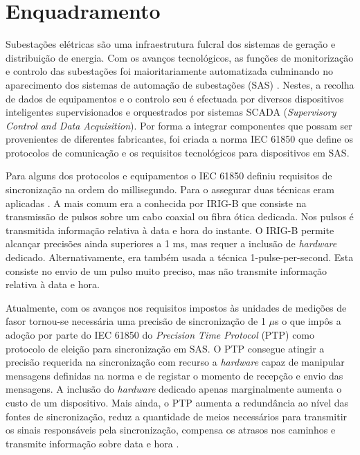\section{Enquadramento}
Subestações elétricas são uma infraestrutura fulcral dos sistemas de geração e distribuição de energia. Com os avanços tecnológicos, as funções de monitorização e controlo das subestações foi maioritariamente automatizada culminando no aparecimento dos sistemas de automação de subestações (SAS) \cite{SAS}. Nestes, a recolha de dados de equipamentos e o controlo seu é efectuada por diversos dispositivos inteligentes supervisionados e orquestrados por sistemas SCADA (\textit{Supervisory Control and Data Acquisition}). Por forma a integrar componentes que possam ser provenientes de diferentes fabricantes, foi criada a norma IEC 61850 que define os protocolos de comunicação e os requisitos tecnológicos para dispositivos em SAS.    \par 
Para alguns dos protocolos e equipamentos o IEC 61850 definiu requisitos de sincronização na ordem do millisegundo. Para o assegurar duas técnicas eram aplicadas \cite{Electrical}. A mais comum era a conhecida por IRIG-B que consiste na transmissão de pulsos sobre um cabo coaxial ou fibra ótica dedicada. Nos pulsos é transmitida informação relativa à data e hora do instante. O IRIG-B permite alcançar precisões ainda superiores a 1 ms, mas requer a inclusão de \textit{hardware} dedicado. Alternativamente, era também usada a técnica 1-pulse-per-second. Esta consiste no envio de um pulso muito preciso, mas não transmite informação relativa à data e hora.\par 
Atualmente, com os avanços nos requisitos impostos às unidades de medições de fasor tornou-se necessária uma precisão de sincronização de 1 $\mu$s o que impôs a adoção por parte do IEC 61850 do \textit{Precision Time Protocol} (PTP) \cite{PTP} como protocolo de eleição para sincronização em SAS. O PTP consegue atingir a precisão requerida na sincronização com recurso a \textit{hardware} capaz de manipular mensagens definidas na norma e de registar o momento de recepção e envio das mensagens. A inclusão do \textit{hardware} dedicado apenas marginalmente aumenta o custo de um dispositivo. Mais ainda, o PTP aumenta a redundância ao nível das fontes de sincronização, reduz a quantidade de meios necessários para transmitir os sinais responsáveis pela sincronização, compensa os atrasos nos caminhos e transmite informação sobre data e hora \cite{comparison}. \par 

